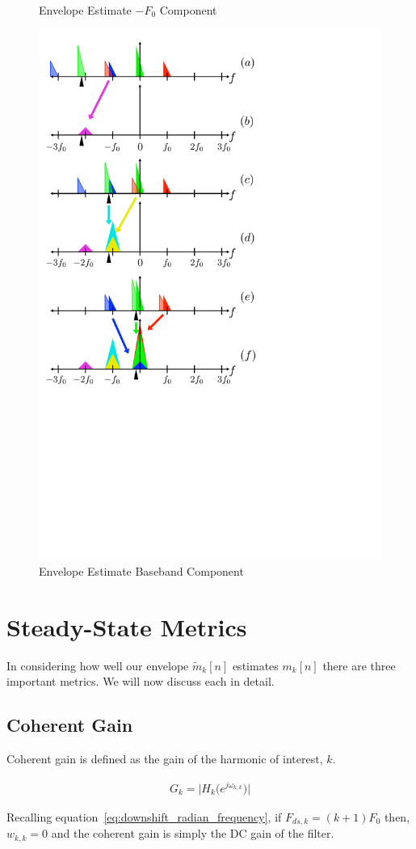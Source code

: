 \documentclass [11pt, proquest] {uwthesis}[2015/03/03]
\begin{document}
\begin{figure}[!ht]
    \caption{Envelope Estimate $-F_0$ Component}
    \label{fig:harmonic_envelope_0}
    \includegraphics[width=.62\textwidth]{harmonic_envelope_0}
    \caption{Envelope Estimate Baseband Component}
\end{figure}

\section{Steady-State Metrics}

In considering how well our envelope $\tilde{m}_k[n]$ estimates $m_k[n]$ there are three important metrics.  We will now discuss each in detail.

\subsection{Coherent Gain}

Coherent gain is defined as the gain of the harmonic of interest, $k$.

\begin{align}
G_k = \Big| H_k\big(e^{j\omega_{k,k}}\big) \Big|
\end{align}

Recalling equation~\ref{eq:downshift_radian_frequency}, if $F_{ds,k} = (k+1)F_0$ then, $w_{k,k} = 0$ and the coherent gain is simply the DC gain of the filter.
\end{document}

